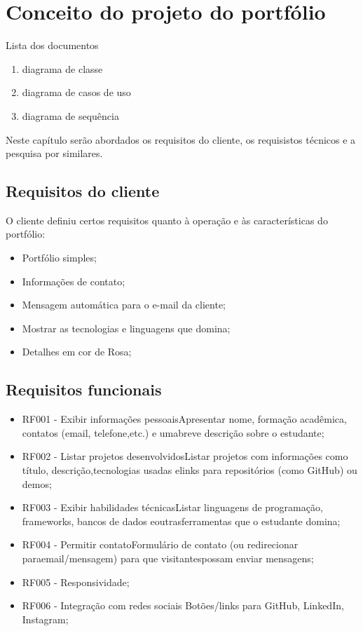 \chapter{Conceito do projeto do portfólio}
\label{chap:fundteor}


Lista dos documentos
\begin{enumerate}
   \item diagrama de classe
   \item diagrama de casos de uso
   \item diagrama de sequência
\end{enumerate}


Neste capítulo serão abordados os requisitos do cliente, os requisistos técnicos e a pesquisa por similares. 



\section{Requisitos do cliente}
 O cliente definiu certos requisitos quanto à operação e  às características do portfólio:
 \begin{itemize}
    \item Portfólio simples;
    \item Informações de contato;
    \item Mensagem automática para o e-mail da cliente;
    \item Mostrar as tecnologias e linguagens que domina;
    \item Detalhes em cor de Rosa;
 \end{itemize}

 \section{Requisitos funcionais}
 
 \begin{itemize}
 \item RF001 - Exibir informações pessoaisApresentar nome, formação acadêmica, contatos (email, telefone,etc.) e umabreve descrição sobre o estudante;
 \item RF002 - Listar projetos desenvolvidosListar projetos com informações como título, descrição,tecnologias usadas elinks para repositórios (como GitHub) ou demos;
 \item RF003 - Exibir habilidades técnicasListar linguagens de programação, frameworks, bancos de dados eoutrasferramentas que o estudante domina;
 \item RF004 - Permitir contatoFormulário de contato (ou redirecionar paraemail/mensagem) para que visitantespossam enviar mensagens;
 \item RF005 - Responsividade;
 \item RF006 - Integração com redes sociais Botões/links para GitHub, LinkedIn, Instagram;
\end{itemize}



